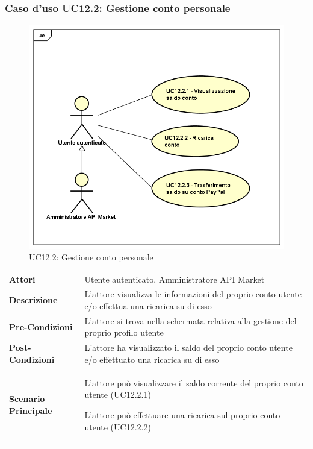 \newpage
\subsubsection{Caso d'uso UC12.2: Gestione conto personale}
\label{UC12_2}
\begin{figure}[ht]
	\centering
	\includegraphics[scale=0.45]{UML/UC12_2.png}
	\caption{UC12.2: Gestione conto personale}
\end{figure}

\begin{minipage}{\linewidth}
	\begin{tabular}{ l | p{11cm}}
		\hline
		\rowcolor{Gray}
		\multicolumn{2}{c}{UC12.2 - Gestione conto personale} \\
		\hline
		\textbf{Attori} & Utente autenticato, Amministratore API Market \\
		\textbf{Descrizione} & L'attore visualizza le informazioni del proprio conto utente e/o effettua una ricarica su di esso \\
		\textbf{Pre-Condizioni} & L'attore si trova nella schermata relativa alla gestione del proprio profilo utente \\
		\textbf{Post-Condizioni} & L'attore ha visualizzato il saldo del proprio conto utente e/o effettuato una ricarica su di esso \\
		\textbf{Scenario Principale} & 
		\begin{enumerate*}[label=(\arabic*.),itemjoin={\newline}]
			\item L'attore può visualizzare il saldo corrente del proprio conto utente (UC12.2.1)
			\item L'attore può effettuare una ricarica sul proprio conto utente (UC12.2.2)
		\end{enumerate*}
	\end{tabular}
\end{minipage}

